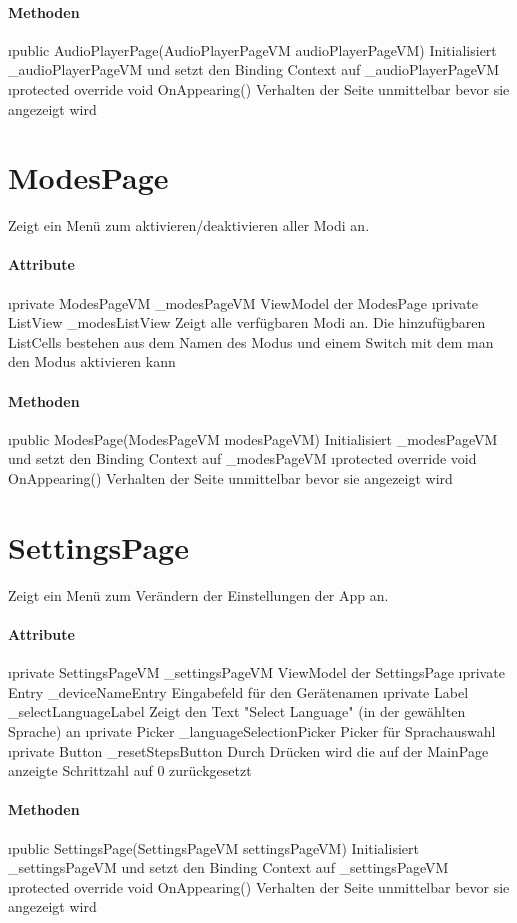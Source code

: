 \documentclass[../entwurf.tex]{subfiles}
\begin{document}
\paragraph{Methoden}

\begin{itemize}
	\i{public AudioPlayerPage(AudioPlayerPageVM audioPlayerPageVM)} Initialisiert \_audioPlayerPageVM und setzt den Binding Context 			auf \_audioPlayerPageVM
	\i{protected override void OnAppearing()} Verhalten der Seite unmittelbar bevor sie angezeigt wird
\end{itemize}

\section{ModesPage}
Zeigt ein Menü zum aktivieren/deaktivieren aller Modi an.
\paragraph{Attribute}
\begin{itemize}
	\i{private ModesPageVM \_modesPageVM} ViewModel der ModesPage
	\i{private ListView \_modesListView} Zeigt alle verfügbaren Modi an. Die hinzufügbaren ListCells bestehen aus dem Namen des Modus und einem Switch mit dem man den Modus aktivieren kann
\end{itemize}

\paragraph{Methoden}

\begin{itemize}
	\i{public ModesPage(ModesPageVM modesPageVM)} Initialisiert \_modesPageVM und setzt den Binding Context 			auf \_modesPageVM
	\i{protected override void OnAppearing()} Verhalten der Seite unmittelbar bevor sie angezeigt wird
\end{itemize}

\section{SettingsPage}
Zeigt ein Menü zum Verändern der Einstellungen der App an.
\paragraph{Attribute}

\begin{itemize}
	\i{private SettingsPageVM \_settingsPageVM} ViewModel der SettingsPage
	\i{private Entry \_deviceNameEntry} Eingabefeld für den Gerätenamen
	\i{private Label \_selectLanguageLabel} Zeigt den Text "Select Language" (in der gewählten Sprache) an
	\i{private Picker \_languageSelectionPicker} Picker für Sprachauswahl
	\i{private Button \_resetStepsButton} Durch Drücken wird die auf der MainPage anzeigte Schrittzahl auf 0 zurückgesetzt
\end{itemize}

\paragraph{Methoden}

\begin{itemize}
	\i{public SettingsPage(SettingsPageVM settingsPageVM)} Initialisiert \_settingsPageVM und setzt den Binding Context 			auf \_settingsPageVM
	\i{protected override void OnAppearing()} Verhalten der Seite unmittelbar bevor sie angezeigt wird
\end{itemize}
\end{document}
